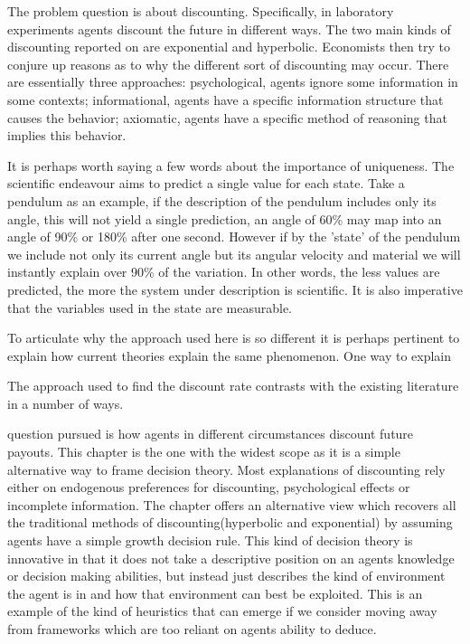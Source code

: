 The problem question is about discounting. Specifically, in laboratory experiments agents discount the future in different ways. The two main kinds of discounting reported on are exponential and hyperbolic. Economists then try to conjure up reasons as to why the different sort of discounting may occur. There are essentially three approaches: psychological, agents ignore some information in some contexts; informational, agents have a specific information structure that causes the behavior; axiomatic, agents have a specific method of reasoning that implies this behavior. 

It is perhaps worth saying a few words about the importance of uniqueness. The scientific endeavour aims to predict a single value for each state. Take a pendulum as an example, if the description of the pendulum includes only its angle, this will not yield a single prediction, an angle of 60\% may map into an angle of 90\% or 180\% after one second. However if by the 'state' of the pendulum we include not only its current angle but its angular velocity and material we will instantly explain over 90\% of the variation. In other words, the less values are predicted, the more the system under description is scientific. It is also imperative that the variables used in the state are measurable. 

To articulate why the approach used here is so different it is perhaps pertinent to explain how current theories explain the same phenomenon. One way to explain

The approach used to find the discount rate contrasts with the existing literature in a number of ways. 

 question pursued is how agents in different circumstances discount future payouts. This chapter is the one with the widest scope as it is a simple alternative way to frame decision theory. Most explanations of discounting rely either on endogenous preferences for discounting, psychological effects or incomplete information. The chapter offers an alternative view which recovers all the traditional methods of discounting(hyperbolic and exponential) by assuming agents have a simple growth decision rule. This kind of decision theory is innovative in that it does not take a descriptive position on an agents knowledge or decision making abilities, but instead just describes the kind of environment the agent is in and how that environment can best be exploited. This is an example of the kind of heuristics that can emerge if we consider moving away from frameworks which are too reliant on agents ability to deduce.

